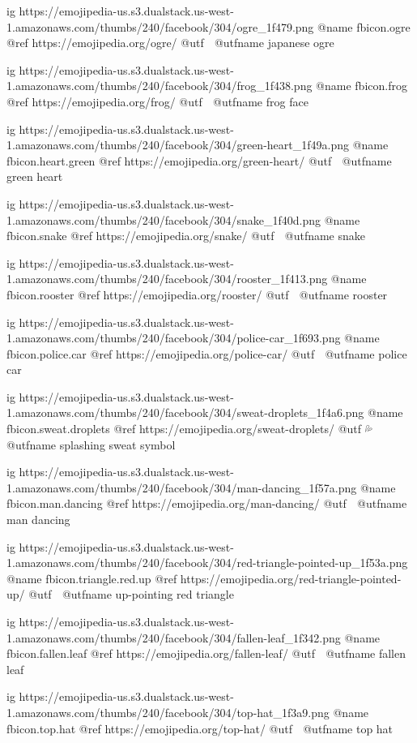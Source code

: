 	ig https://emojipedia-us.s3.dualstack.us-west-1.amazonaws.com/thumbs/240/facebook/304/ogre_1f479.png
	@name fbicon.ogre
	@ref https://emojipedia.org/ogre/
	@utf 👹
	@utfname japanese ogre

	ig https://emojipedia-us.s3.dualstack.us-west-1.amazonaws.com/thumbs/240/facebook/304/frog_1f438.png
	@name fbicon.frog
	@ref https://emojipedia.org/frog/
	@utf 🐸
	@utfname frog face

	ig https://emojipedia-us.s3.dualstack.us-west-1.amazonaws.com/thumbs/240/facebook/304/green-heart_1f49a.png
	@name fbicon.heart.green 
	@ref https://emojipedia.org/green-heart/
	@utf 💚
	@utfname green heart

	ig https://emojipedia-us.s3.dualstack.us-west-1.amazonaws.com/thumbs/240/facebook/304/snake_1f40d.png
	@name fbicon.snake
	@ref https://emojipedia.org/snake/
	@utf 🐍
	@utfname snake

	ig https://emojipedia-us.s3.dualstack.us-west-1.amazonaws.com/thumbs/240/facebook/304/rooster_1f413.png
	@name fbicon.rooster
	@ref https://emojipedia.org/rooster/
	@utf 🐓
	@utfname rooster

	ig https://emojipedia-us.s3.dualstack.us-west-1.amazonaws.com/thumbs/240/facebook/304/police-car_1f693.png
	@name fbicon.police.car
	@ref https://emojipedia.org/police-car/
	@utf 🚓
	@utfname police car

	ig https://emojipedia-us.s3.dualstack.us-west-1.amazonaws.com/thumbs/240/facebook/304/sweat-droplets_1f4a6.png
	@name fbicon.sweat.droplets
	@ref https://emojipedia.org/sweat-droplets/
	@utf 💦
	@utfname splashing sweat symbol

	ig https://emojipedia-us.s3.dualstack.us-west-1.amazonaws.com/thumbs/240/facebook/304/man-dancing_1f57a.png
	@name fbicon.man.dancing
	@ref https://emojipedia.org/man-dancing/
	@utf 🕺
	@utfname man dancing

	ig https://emojipedia-us.s3.dualstack.us-west-1.amazonaws.com/thumbs/240/facebook/304/red-triangle-pointed-up_1f53a.png
	@name fbicon.triangle.red.up
	@ref https://emojipedia.org/red-triangle-pointed-up/
	@utf 🔺
	@utfname up-pointing red triangle

	ig https://emojipedia-us.s3.dualstack.us-west-1.amazonaws.com/thumbs/240/facebook/304/fallen-leaf_1f342.png
	@name fbicon.fallen.leaf
	@ref https://emojipedia.org/fallen-leaf/
	@utf 🍂
	@utfname fallen leaf

	ig https://emojipedia-us.s3.dualstack.us-west-1.amazonaws.com/thumbs/240/facebook/304/top-hat_1f3a9.png
	@name fbicon.top.hat
	@ref https://emojipedia.org/top-hat/
	@utf 🎩
	@utfname top hat

